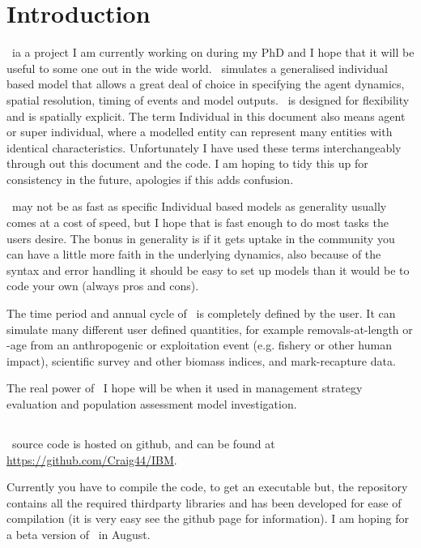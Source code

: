 \section{Introduction\label{sec:Introduction}} 

\IBM\ ia a project I am currently working on during my PhD and I hope that it will be useful to some one out in the wide world. \IBM\ simulates a generalised individual based model that allows a great deal of choice in specifying the agent dynamics, spatial resolution, timing of events and model outputs. \IBM\ is designed for flexibility and is spatially explicit. The term Individual in this document also means agent or super individual, where a modelled entity can represent many entities with identical characteristics. Unfortunately I have used these terms interchangeably through out this document and the code. I am hoping to tidy this up for consistency in the future, apologies if this adds confusion.

\IBM\ may not be as fast as specific Individual based models as generality usually comes at a cost of speed, but I hope that is fast enough to do most tasks the users desire. The bonus in generality is if it gets uptake in the community you can have a little more faith in the underlying dynamics, also because of the syntax and error handling it should be easy to set up models than it would be to code your own (always pros and cons).

The time period and annual cycle of \IBM\ is completely defined by the user. It can simulate many different user defined quantities, for example removals-at-length or -age from an anthropogenic or exploitation event (e.g. fishery or other human impact), scientific survey and other biomass indices, and mark-recapture data.

The real power of \IBM\ I hope will be when it used in management strategy evaluation and population assessment model investigation.

\subsection{}
\IBM\ source code is hosted on github, and can be found at \url{https://github.com/Craig44/IBM}.

Currently you have to compile the code, to get an executable but, the repository contains all the required thirdparty libraries and has been developed for ease of compilation (it is very easy see the github page for information). I am hoping for a beta version of \IBM\ in August.

